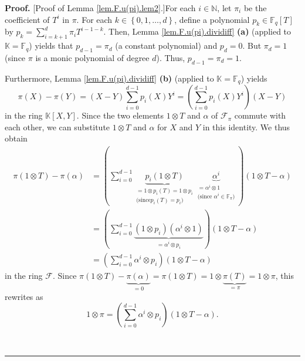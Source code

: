 \documentclass[numbers=enddot,12pt,final,onecolumn,notitlepage]{scrartcl}%
\theoremstyle{definition}
\newenvironment{proof}[1][Proof]{\noindent\textbf{#1.} }{\ \rule{0.5em}{0.5em}}
\let\sumnonlimits\sum
\renewcommand{\sum}{\sumnonlimits\limits}
\begin{document}
\begin{proof}
[Proof of Lemma \ref{lem.F.u(pi).lem2}.]For each $i\in\mathbb{N}$, let
$\pi_{i}$ be the coefficient of $T^{i}$ in $\pi$. For each $k\in\left\{
0,1,\ldots,d\right\}  $, define a polynomial $p_{k}\in\mathbb{F}_{q}\left[
T\right]  $ by $p_{k}=\sum_{i=k+1}^{d}\pi_{i}T^{i-1-k}$. Then, Lemma
\ref{lem.F.u(pi).dividiff} \textbf{(a)} (applied to $\mathbb{K}=\mathbb{F}%
_{q}$) yields that $p_{d-1}=\pi_{d}$ (a constant polynomial) and $p_{d}=0$.
But $\pi_{d}=1$ (since $\pi$ is a monic polynomial of degree $d$). Thus,
$p_{d-1}=\pi_{d}=1$.

Furthermore, Lemma \ref{lem.F.u(pi).dividiff} \textbf{(b)} (applied to
$\mathbb{K}=\mathbb{F}_{q}$) yields
\[
\pi\left(  X\right)  -\pi\left(  Y\right)  =\left(  X-Y\right)  \sum
_{i=0}^{d-1}p_{i}\left(  X\right)  Y^{i}=\left(  \sum_{i=0}^{d-1}p_{i}\left(
X\right)  Y^{i}\right)  \left(  X-Y\right)
\]
in the ring $\mathbb{K}\left[  X,Y\right]  $. Since the two elements $1\otimes
T$ and $\alpha$ of $\mathcal{F}_{\pi}$ commute with each other, we can
substitute $1\otimes T$ and $\alpha$ for $X$ and $Y$ in this identity. We thus
obtain%
\begin{align*}
\pi\left(  1\otimes T\right)  -\pi\left(  \alpha\right)   &  =\left(
\sum_{i=0}^{d-1}\underbrace{p_{i}\left(  1\otimes T\right)  }%
_{\substack{=1\otimes p_{i}\left(  T\right)  =1\otimes p_{i}\\\text{(since
}p_{i}\left(  T\right)  =p_{i}\text{)}}}\underbrace{\alpha^{i}}%
_{\substack{=\alpha^{i}\otimes1\\\text{(since }\alpha^{i}\in\mathbb{F}_{\pi
}\text{)}}}\right)  \left(  1\otimes T-\alpha\right) \\
&  =\left(  \sum_{i=0}^{d-1}\underbrace{\left(  1\otimes p_{i}\right)  \left(
\alpha^{i}\otimes1\right)  }_{=\alpha^{i}\otimes p_{i}}\right)  \left(
1\otimes T-\alpha\right) \\
&  =\left(  \sum_{i=0}^{d-1}\alpha^{i}\otimes p_{i}\right)  \left(  1\otimes
T-\alpha\right)
\end{align*}
in the ring $\mathcal{F}$. Since $\pi\left(  1\otimes T\right)
-\underbrace{\pi\left(  \alpha\right)  }_{=0}=\pi\left(  1\otimes T\right)
=1\otimes\underbrace{\pi\left(  T\right)  }_{=\pi}=1\otimes\pi$, this rewrites
as
\begin{equation}
1\otimes\pi=\left(  \sum_{i=0}^{d-1}\alpha^{i}\otimes p_{i}\right)  \left(
1\otimes T-\alpha\right)  . \label{pf.lem.F.u(pi).lem2.1}%
\end{equation}



\end{proof}
\end{document}
